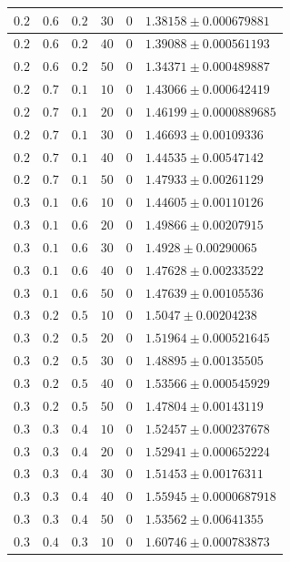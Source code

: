 \documentclass[14pt]{extreport}
\begin{document}
\begin{center}
\begin{longtable}{|p{1cm}|p{1cm}|p{1cm}|p{1cm}|p{1cm}|p{8cm}|}
$0.2$ & $0.6$ & $0.2$ & $30$ & $0$ & $1.38158 \pm 0.000679881$ \\ \hline
$0.2$ & $0.6$ & $0.2$ & $40$ & $0$ & $1.39088 \pm 0.000561193$ \\ \hline
$0.2$ & $0.6$ & $0.2$ & $50$ & $0$ & $1.34371 \pm 0.000489887$ \\ \hline
$0.2$ & $0.7$ & $0.1$ & $10$ & $0$ & $1.43066 \pm 0.000642419$ \\ \hline
$0.2$ & $0.7$ & $0.1$ & $20$ & $0$ & $1.46199 \pm 0.0000889685$ \\ \hline
$0.2$ & $0.7$ & $0.1$ & $30$ & $0$ & $1.46693 \pm 0.00109336$ \\ \hline
$0.2$ & $0.7$ & $0.1$ & $40$ & $0$ & $1.44535 \pm 0.00547142$ \\ \hline
$0.2$ & $0.7$ & $0.1$ & $50$ & $0$ & $1.47933 \pm 0.00261129$ \\ \hline
$0.3$ & $0.1$ & $0.6$ & $10$ & $0$ & $1.44605 \pm 0.00110126$ \\ \hline
$0.3$ & $0.1$ & $0.6$ & $20$ & $0$ & $1.49866 \pm 0.00207915$ \\ \hline
$0.3$ & $0.1$ & $0.6$ & $30$ & $0$ & $1.4928 \pm 0.00290065$ \\ \hline
$0.3$ & $0.1$ & $0.6$ & $40$ & $0$ & $1.47628 \pm 0.00233522$ \\ \hline
$0.3$ & $0.1$ & $0.6$ & $50$ & $0$ & $1.47639 \pm 0.00105536$ \\ \hline
$0.3$ & $0.2$ & $0.5$ & $10$ & $0$ & $1.5047 \pm 0.00204238$ \\ \hline
$0.3$ & $0.2$ & $0.5$ & $20$ & $0$ & $1.51964 \pm 0.000521645$ \\ \hline
$0.3$ & $0.2$ & $0.5$ & $30$ & $0$ & $1.48895 \pm 0.00135505$ \\ \hline
$0.3$ & $0.2$ & $0.5$ & $40$ & $0$ & $1.53566 \pm 0.000545929$ \\ \hline
$0.3$ & $0.2$ & $0.5$ & $50$ & $0$ & $1.47804 \pm 0.00143119$ \\ \hline
$0.3$ & $0.3$ & $0.4$ & $10$ & $0$ & $1.52457 \pm 0.000237678$ \\ \hline
$0.3$ & $0.3$ & $0.4$ & $20$ & $0$ & $1.52941 \pm 0.000652224$ \\ \hline
$0.3$ & $0.3$ & $0.4$ & $30$ & $0$ & $1.51453 \pm 0.00176311$ \\ \hline
$0.3$ & $0.3$ & $0.4$ & $40$ & $0$ & $1.55945 \pm 0.0000687918$ \\ \hline
$0.3$ & $0.3$ & $0.4$ & $50$ & $0$ & $1.53562 \pm 0.00641355$ \\ \hline
$0.3$ & $0.4$ & $0.3$ & $10$ & $0$ & $1.60746 \pm 0.000783873$ \\ \hline

\end{longtable}
\end{center}
\end{document}

